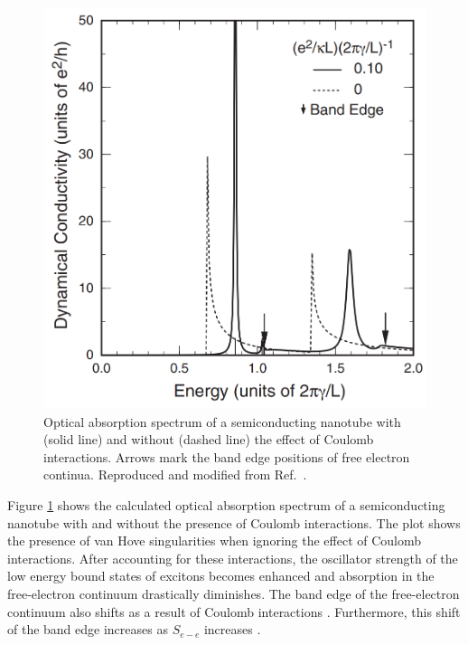 \begin{figure}[ht]
	\centering
	\includegraphics[scale=0.35]{images/chapter_optical_props/ando_suppression}
	\caption{Optical absorption spectrum of a semiconducting nanotube with (solid line) and without (dashed line) the effect of Coulomb interactions. Arrows mark the band edge positions of free electron continua. Reproduced and modified from Ref.\ \cite{ando2005theory}.}
	\label{fig:ando_suppression}
\end{figure}

Figure \ref{fig:ando_suppression} shows the calculated optical absorption spectrum of a semiconducting nanotube with and without the presence of Coulomb interactions. The plot shows the presence of van Hove singularities when ignoring the effect of Coulomb interactions. After accounting for these interactions, the oscillator strength of the low energy bound states of excitons becomes enhanced and absorption in the free-electron continuum drastically diminishes. The band edge of the free-electron continuum also shifts as a result of Coulomb interactions \cite{ando1997excitons}. Furthermore, this shift of the band edge increases as $S_{e-e}$ increases \cite{ando2005theory}.

